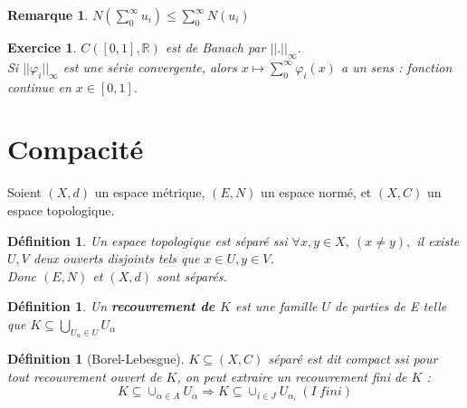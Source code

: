 \documentclass[a4paper, oneside]{report}
\theoremstyle{break}
\newtheorem{defi}[thm]{Définition}
\newtheorem{remar}[thm]{Remarque}
\newtheorem{exo}[thm]{Exercice}
\newcommand{\R}{\mathbb{R}}
\newcommand{\etop}{espace topologique }
\begin{document}
\begin{remar}
$N(\sum_{0}^\infty u_i) \leq \sum_{0}^\infty N(u_i)$
\end{remar}


\begin{exo}
$C([0,1], \R)$ est de Banach par $||.||_\infty$.\\
Si $||\varphi_i||_\infty$ est une série convergente, alors $x\mapsto \sum_{0}^\infty \varphi_i(x)$ a un sens : fonction continue en $x\in [0,1]$.
\end{exo}


\section{Compacité}

Soient $(X,d)$ un espace métrique, $(E,N)$ un espace normé, et $(X,C)$ un espace topologique.

\begin{defi}                    
Un \etop est séparé ssi $\forall x,y\in X,~(x\neq y),$ il existe $U,V$ deux ouverts disjoints tels que $x\in U, y\in V$.\\
Donc $(E,N)$ et $(X,d)$ sont séparés.
\end{defi}

\begin{defi}
Un \textbf{recouvrement de $K$} est une famille $U$ de parties de E telle que $K\subseteq\bigcup_{U_\alpha\in U} U_\alpha$
\end{defi}


\begin{defi}[Borel-Lebesgue]
$K\subseteq (X,C)$ séparé est dit compact ssi pour tout recouvrement ouvert de $K$, on peut extraire un recouvrement fini de $K$ :
$$K\subseteq \cup_{\alpha \in A}U_\alpha \Rightarrow K\subseteq \cup_{i\in J}U_{\alpha_i}~(I~fini)$$
\end{defi}
\end{document}

